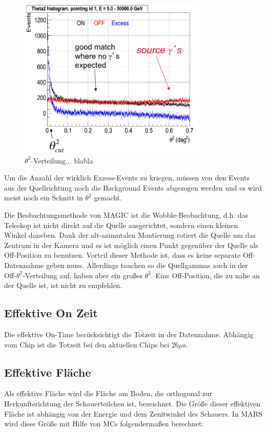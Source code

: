 \begin{figure}
    \centering
    \includegraphics[width=0.8\textwidth]{./Plots/Theta2Example.png}
    \caption{$\theta^2$-Verteilung... blabla}
    \label{Disp}
\end{figure}

Um die Anzahl der wirklich Exzess-Events zu kriegen, müssen von den Events aus der Quellrichtung noch die Background Events abgezogen werden und es wird meist noch ein Schnitt in $\theta^2$ gemacht.

Die Beobachtungsmethode von MAGIC ist die Wobble-Beobachtung, d.h. das Teleskop ist nicht direkt auf die Quelle ausgerichtet, sondern einen kleinen Winkel daneben.
Dank der alt-azimutalen Montierung rotiert die Quelle um das Zentrum in der Kamera und es ist möglich einen Punkt gegenüber der Quelle als Off-Position zu benutzen.
Vorteil dieser Methode ist, dass es keine separate Off-Datennahme geben muss.
Allerdings tauchen so die Quellgammas auch in der Off-$\theta^2$-Verteilung auf, haben aber ein großes $\theta^2$.
Eine Off-Position, die zu nahe an der Quelle ist, ist nicht zu empfehlen.

\subsection{Effektive On Zeit}
Die effektive On-Time berücksichtigt die Totzeit in der Datennahme.
Abhängig vom Chip ist die Totzeit bei den aktuellen Chips bei 26$\mu$s.

\subsection{Effektive Fläche}
Als effektive Fläche wird die Fläche am Boden, die orthogonal zur Herkunftsrichtung der Schauerteilchen ist, bezeichnet.
Die Größe dieser effektiven Fläche ist abhängig von der Energie und dem Zenitwinkel des Schauers.
In MARS wird diese Größe mit Hilfe von MCs folgendermaßen berechnet:

